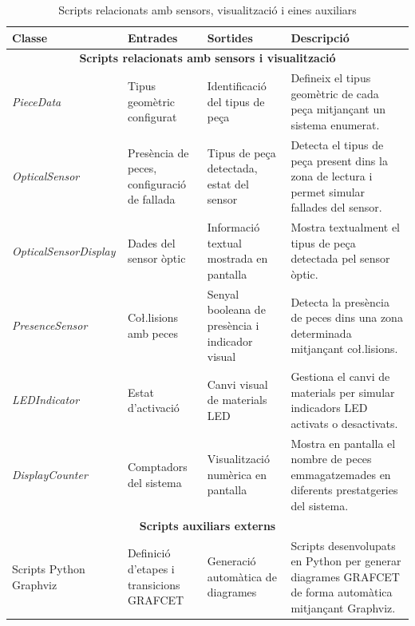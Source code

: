 \documentclass[a4paper,11pt,DIV=13,headings=normal,abstract=true,twoside=semi]{article}
\newcommand{\acro}[1]{\textsc{#1}}
\begin{document}
\begin{table}[H]
\centering
\small
\caption{Scripts relacionats amb sensors, visualització i eines auxiliars}
\label{tab:unity_classes_2}
\begin{tabularx}{\textwidth}{|p{2.9cm}|p{3.4cm}|p{3.4cm}|X|}
\hline
\textbf{Classe} & \textbf{Entrades} & \textbf{Sortides} & \textbf{Descripció} \\
\hline

\multicolumn{4}{|c|}{\textbf{Scripts relacionats amb sensors i visualització}} \\
\hline

\emph{PieceData}
& Tipus geomètric configurat
& Identificació del tipus de peça
& Defineix el tipus geomètric de cada peça mitjançant un sistema enumerat. \\
\hline

\emph{OpticalSensor}
& Presència de peces, configuració de fallada
& Tipus de peça detectada, estat del sensor
& Detecta el tipus de peça present dins la zona de lectura i permet simular fallades del sensor. \\
\hline

\emph{OpticalSensorDisplay}
& Dades del sensor òptic
& Informació textual mostrada en pantalla
& Mostra textualment el tipus de peça detectada pel sensor òptic. \\
\hline

\emph{PresenceSensor}
& Co\l.lisions amb peces
& Senyal booleana de presència i indicador visual
& Detecta la presència de peces dins una zona determinada mitjançant co\l.lisions. \\
\hline

\emph{LEDIndicator}
& Estat d'activació
& Canvi visual de materials LED
& Gestiona el canvi de materials per simular indicadors LED activats o desactivats. \\
\hline

\emph{DisplayCounter}
& Comptadors del sistema
& Visualització numèrica en pantalla
& Mostra en pantalla el nombre de peces emmagatzemades en diferents prestatgeries del sistema. \\
\hline

\multicolumn{4}{|c|}{\textbf{Scripts auxiliars externs}} \\ 
\hline

Scripts Python Graphviz
& Definició d'etapes i transicions \acro{GRAFCET}
& Generació automàtica de diagrames
& Scripts desenvolupats en Python per generar diagrames \acro{GRAFCET} de forma automàtica mitjançant Graphviz. \\
\hline

\end{tabularx}
\end{table}
\end{document}
